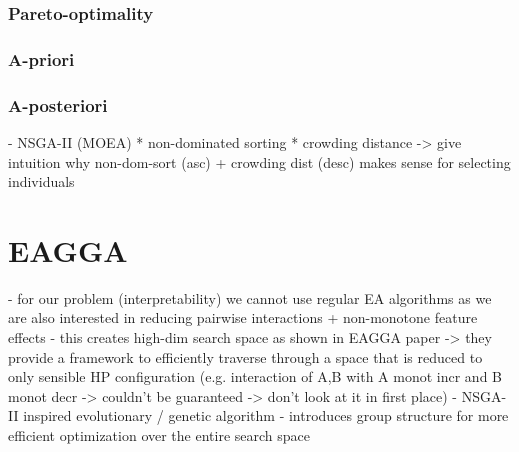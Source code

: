 \documentclass[twoside,11pt]{article}
\begin{document}
\subsubsection{Pareto-optimality}
\subsubsection{A-priori}
\subsubsection{A-posteriori}
- NSGA-II (MOEA)
  * non-dominated sorting
  * crowding distance
  -> give intuition why non-dom-sort (asc) + crowding dist (desc) makes sense for selecting individuals


\section{EAGGA}
- for our problem (interpretability) we cannot use regular EA algorithms as we are also interested in reducing pairwise interactions + non-monotone feature effects
- this creates high-dim search space as shown in EAGGA paper -> they provide a framework to efficiently traverse through a space that is reduced to only sensible HP
  configuration (e.g. interaction of A,B with A monot incr and B monot decr -> couldn't be guaranteed -> don't look at it in first place)
- NSGA-II inspired evolutionary / genetic algorithm
- introduces group structure for more efficient optimization over the entire search space
\end{document}
